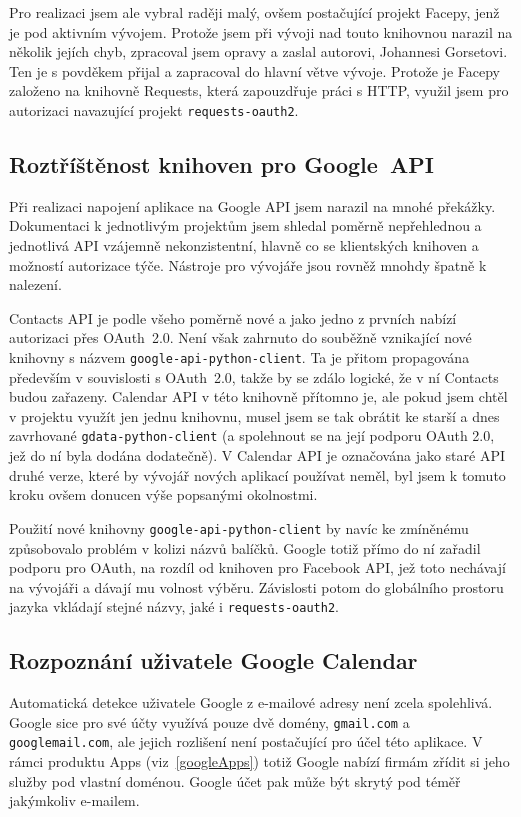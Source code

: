 \documentclass[12pt,oneside,final]{fithesis2}
\begin{document}
Pro realizaci jsem ale vybral raději malý, ovšem postačující projekt Facepy, jenž je pod aktivním vývojem. Protože jsem při vývoji nad touto knihovnou narazil na několik jejích chyb, zpracoval jsem opravy a zaslal autorovi, Johannesi Gorsetovi. Ten je s povděkem přijal a zapracoval do hlavní větve vývoje. Protože je Facepy založeno na knihovně Requests, která zapouzdřuje práci s HTTP, využil jsem pro autorizaci navazující projekt {\tt requests-oauth2}.

\subsection{Roztříštěnost knihoven pro Google~API}
Při realizaci napojení aplikace na Google API jsem narazil na mnohé překážky. Dokumentaci k jednotlivým projektům jsem shledal poměrně nepřehlednou a jednotlivá API vzájemně nekonzistentní, hlavně co se klientských knihoven a možností autorizace týče. Nástroje pro vývojáře jsou rovněž mnohdy špatně k nalezení.

Contacts API je podle všeho poměrně nové a jako jedno z prvních nabízí autorizaci přes OAuth~2.0. Není však zahrnuto do souběžně vznikající nové knihovny s názvem {\tt google-api-python-client}. Ta je přitom propagována především v souvislosti s OAuth~2.0, takže by se zdálo logické, že v ní Contacts budou zařazeny. Calendar API v této knihovně přítomno je, ale pokud jsem chtěl v projektu využít jen jednu knihovnu, musel jsem se tak obrátit ke starší a dnes zavrhované {\tt gdata-python-client} (a spolehnout se na její podporu OAuth 2.0, jež do ní byla dodána dodatečně). V Calendar API je označována jako staré API druhé verze, které by vývojář nových aplikací používat neměl, byl jsem k tomuto kroku ovšem donucen výše popsanými okolnostmi.

Použití nové knihovny {\tt google-api-python-client} by navíc ke zmíněnému způsobovalo problém v kolizi názvů balíčků. Google totiž přímo do ní zařadil podporu pro OAuth, na rozdíl od knihoven pro Facebook API, jež toto nechávají na vývojáři a dávají mu volnost výběru. Závislosti potom do globálního prostoru jazyka vkládají stejné názvy, jaké i {\tt requests-oauth2}.

\subsection{Rozpoznání uživatele Google Calendar}
Automatická detekce uživatele Google z e-mailové adresy není zcela spolehlivá. Google sice pro své účty využívá pouze dvě domény, {\tt gmail.com} a {\tt googlemail.com}, ale jejich rozlišení není postačující pro účel této aplikace. V rámci produktu Apps (viz~\ref{googleApps}) totiž Google nabízí firmám zřídit si jeho služby pod vlastní doménou. Google účet pak může být skrytý pod téměř jakýmkoliv e-mailem.
\end{document}

